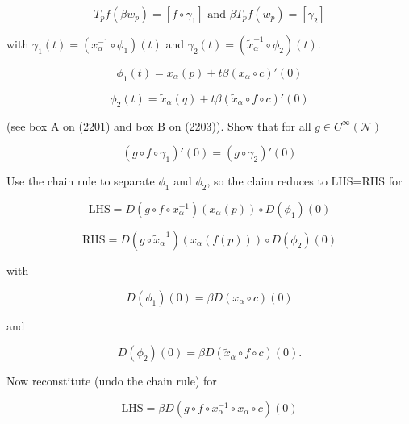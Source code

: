 \documentclass[12pt]{article}
\begin{document}
\begin{equation}
  \label{eq:aiquoowo}
  T_{p}f(\beta{}w_{p})=[f\circ\gamma_{1}]\mbox{ and }\beta{}T_{p}f(w_{p})=[\gamma_{2}]
\end{equation}

with $\gamma_{1}(t)=(x_{\alpha}^{-1}\circ\phi_{1})(t)$ and
$\gamma_{2}(t)=(\tilde{x}_{\alpha}^{-1}\circ\phi_{2})(t)$.

\begin{equation}
  \label{eq:engainok}
  \phi_{1}(t)=x_{\alpha}(p)+t\beta(x_{\alpha}\circ{}c)'(0)
\end{equation}

\begin{equation}
  \label{eq:pheequai}
  \phi_{2}(t)=\tilde{x}_{\alpha}(q)+t\beta(\tilde{x}_{\alpha}\circ{}f\circ{}c)'(0)
\end{equation}

(see box A on (2201) and box B on (2203)). Show that for all
$g\in{}C^{\infty}(\mathcal{N})$

\begin{equation}
  \label{eq:haithead}
  (g\circ{}f\circ\gamma_{1})'(0)=(g\circ\gamma_{2})'(0)
\end{equation}

Use the chain rule to separate $\phi_{1}$ and $\phi_{2}$, so the claim
reduces to LHS=RHS for

\begin{equation}
  \label{eq:ohngooze}
  \mbox{LHS}=D(g\circ{}f\circ{}x_{\alpha}^{-1})(x_{\alpha}(p))\circ{}D(\phi_{1})(0)
\end{equation}

\begin{equation}
  \label{eq:uboowaef}
  \mbox{RHS}=D(g\circ{}\tilde{x}_{\alpha}^{-1})(x_{\alpha}(f(p)))\circ{}D(\phi_{2})(0)
\end{equation}

with

\begin{equation}
  \label{eq:jahgeito}
D(\phi_{1})(0)=\beta{}D(x_{\alpha}\circ{}c)(0)  
\end{equation}

and

\begin{equation}
  \label{eq:ohquutee}
D(\phi_{2})(0)=\beta{}D(\tilde{x}_{\alpha}\circ{}f\circ{}c)(0).
\end{equation}

Now reconstitute (undo the chain rule) for

\begin{equation}
  \label{eq:zeicaero}
\mbox{LHS}=\beta{}D(g\circ{}f\circ{}x_{\alpha}^{-1}\circ{}x_{\alpha}\circ{}c)(0)  
\end{equation}
\end{document}
